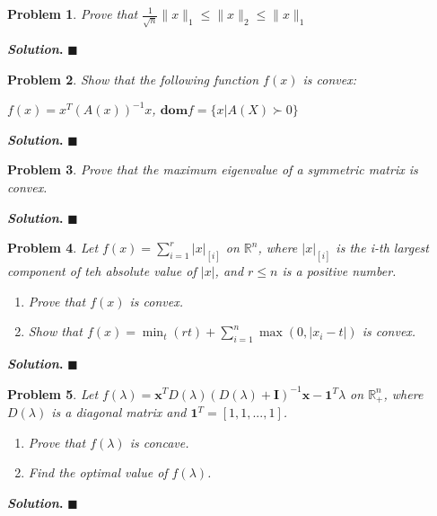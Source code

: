 \documentclass[12pt]{article}
\newtheorem{problem}{Problem}
\newenvironment{solution}[1][\textit{Solution}]{\textbf{#1. }}{$\blacksquare$}
\begin{document}
  \begin{problem}
    Prove that $\frac{1}{\sqrt{n}}\lVert x \rVert_{1} \leq \lVert x \rVert_{2} \leq \lVert x \rVert_{1}$
  \end{problem}
  \begin{solution}
  \end{solution}

  \begin{problem}
    Show that the following function $f(x)$ is convex:\\
    \begin{center}
      $f(x) = x^{T}(A(x))^{-1}x$, $\textbf{dom}{f} = \{x | A(X) \succ 0\}$
    \end{center}
  \end{problem}
  \begin{solution}
  \end{solution}

  \begin{problem}
    Prove that the maximum eigenvalue of a symmetric matrix is convex.
  \end{problem}
  \begin{solution}
  \end{solution}

  \begin{problem}
    Let $f(x) = \sum_{i=1}^{r} |x|_{[i]}$ on $\mathbb{R}^n$, where $|x|_{[i]}$ is the \it{i}-th largest component of teh absolute value of $|x|$, and $r \leq n$ is a positive number. 
    \begin{enumerate}
      \item Prove that $f(x)$ is convex.
      \item Show that $f(x) = \min_{t}(rt) + \sum_{i=1}^{n} \max(0, |x_{i} - t|)$ is convex.
    \end{enumerate}
  \end{problem}
  \begin{solution}
  \end{solution}

  \begin{problem}
    Let $f(\lambda) = \textbf{x}^{T} D(\lambda)(D(\lambda) + \textbf{I})^{-1}\textbf{x} - \textbf{1}^{T}\lambda$ on $\mathbb{R}^{n}_{+}$, where $D(\lambda)$ is a diagonal matrix and $\textbf{1}^T = [1, 1, ..., 1]$.
    \begin{enumerate}
      \item Prove that $f(\lambda)$ is concave.
      \item Find the optimal value of $f(\lambda)$.
    \end{enumerate}
  \end{problem}
  \begin{solution}
  \end{solution}
\end{document}
